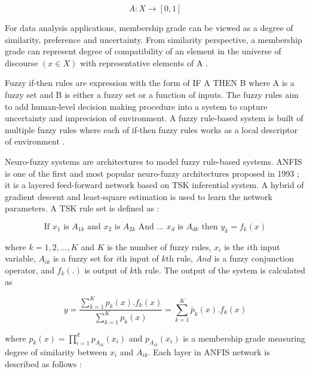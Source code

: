 \documentclass{article}
\begin{document}
\begin{equation} \label{eq:mapping-unit}
A:X \to [0,1]
\end{equation}

For data analysis applications, membership grade can be viewed as a degree of similarity, preference and uncertainty. From similarity perspective, a membership grade can represent degree of compatibility of an element in the universe of discourse $(x \in X)$ with representative elements of A \citep{pedrycz2007fuzzy}. 

Fuzzy if-then rules are expression with the form of IF A THEN B where A is a fuzzy set and B is either a fuzzy set or a function of inputs. The fuzzy rules aim to add human-level decision making procedure into a system to capture uncertainty and imprecision of environment. A fuzzy rule-based system is built of multiple fuzzy rules where each of if-then fuzzy rules works as a local descriptor of environment \citep{angelov2010simple,jang1993anfis}.

Neuro-fuzzy systems are architectures to model fuzzy rule-based systems. ANFIS is one of the first and most popular neuro-fuzzy architectures proposed in 1993 \citep{jang1993anfis}; it is a layered feed-forward network based on TSK inferential system. A hybrid of gradient descent and least-square estimation is used to learn the network parameters. A TSK rule set is defined as \citep{jang1993anfis}:

\begin{equation} \label{eq:tsk}
\textrm{If } x_1 \textrm{ is } A_{1k} \textrm{ and } x_2 \textrm{ is } A_{2k} \textrm{ And ... } x_d \textrm{ is } A_{dk} \textrm{ then } y_k=f_k(x)
\end{equation}

where $k=1,2,...,K$ and $K$ is the number of fuzzy rules, $x_i$ is the $i$th input variable, $A_{ik}$ is a fuzzy set for $i$th input of $k$th rule, $And$ is a fuzzy conjunction operator, and $f_k (.)$ is output of  $k$th rule. The output of the system is calculated as

\begin{equation} \label{eq:output}
y = \frac{\sum_{k=1}^{K} p_k(x).f_k(x)}{\sum_{k=1}^{K} p_k(x)}=   \sum_{k=1}^{K} \bar{p}_k(x).f_k(x)
\end{equation}

where $p_k(x) = \prod_{i=1}^d p_{A_{ik}}(x_i)$ and $p_{A_{ik}}(x_i)$ is a membership grade measuring degree of similarity between $x_i$ and $A_{ik}$. Each layer in ANFIS network is described as follows \cite{jang1993anfis}:
\end{document}
